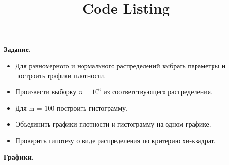 \documentclass{article}
\title{Code Listing}
\begin{document}
{\bf Задание.}

\begin{itemize}
	\item Для равномерного и нормального распределений выбрать параметры и
	построить графики плотности.
	\item Произвести выборку $n = 10^6$ из соответствующего распределения.
	\item Для m = $100$ построить гистограмму.
	\item Объединить графики плотности и гистограмму на одном графике.
	\item Проверить гипотезу о виде распределения по критерию хи-квадрат.
\end{itemize}

\bigskip

{\bf Графики.}\\
\end{document}
